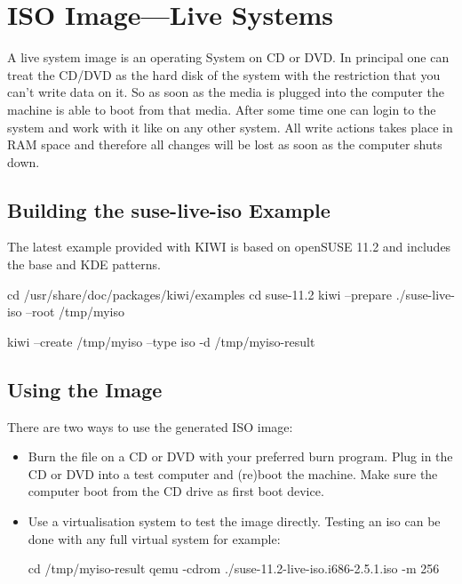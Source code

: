 \chapter{ISO Image---Live Systems}
\label{chapter:iso}
\minitoc

A live system image is an operating System on CD or DVD. In principal
one can treat the CD/DVD as the hard disk of the system with the
restriction that you can't write data on it. So as soon as the media
is plugged into the computer the machine is able to boot from that
media. After some time one can login to the system and work with it
like on any other system. All write actions takes place in RAM space
and therefore all changes will be lost as soon as the computer shuts
down.

\section{Building the suse-live-iso Example}

The latest example provided with KIWI is based on openSUSE 11.2 and
includes the base and KDE patterns.

\begin{Command}{12cm}
cd /usr/share/doc/packages/kiwi/examples
cd suse-11.2
kiwi --prepare ./suse-live-iso --root /tmp/myiso

kiwi --create /tmp/myiso --type iso -d /tmp/myiso-result
\end{Command}

\section{Using the Image}

There are two ways to use the generated ISO image:
\begin{itemize}
\item Burn the  file on a CD or DVD with your preferred burn program.
      Plug in the CD or DVD into a test computer and (re)boot the machine.
      Make sure the computer boot from the CD drive as first boot device.
\item Use a virtualisation system to test the image directly. Testing an
      iso can be done with any full virtual system for example:

\begin{Command}{12cm}
cd /tmp/myiso-result
qemu -cdrom ./suse-11.2-live-iso.i686-2.5.1.iso -m 256
\end{Command}
\end{itemize}

